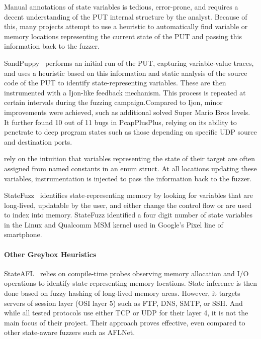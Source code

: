 \documentclass{article}
\let\savedCite=\cite
\renewcommand{\cite}{\unskip~\savedCite}
\begin{document}
\begin{multicols}{2}
  Manual annotations of state variables is tedious, error-prone, and requires a decent understanding of the PUT internal structure by the analyst. Because of this, many projects attempt to use a heuristic to automatically find variable or memory locations representing the current state of the PUT and passing this information back to the fuzzer.

  SandPuppy\cite{SandPuppy} performs an initial run of the PUT, capturing variable-value traces, and uses a heuristic based on this information and static analysis of the source code of the PUT to identify state-representing variables. These are then instrumented with a Ijon-like feedback mechanism. This process is repeated at certain intervals during the fuzzing campaign.Compared to Ijon, minor improvements were achieved, such as additional solved Super Mario Bros levels. It further found 10 out of 11 bugs in PcapPlusPlus, relying on its ability to penetrate to deep program states such as those depending on specific UDP source and destination ports.

  \citeauthor{SGFuzz} rely on the intuition that variables representing the state of their target are often assigned from named constants in an enum struct. At all locations updating these variables, instrumentation is injected to pass the information back to the fuzzer.\cite{SGFuzz}

  StateFuzz\cite{StateFuzz} identifies state-representing memory by looking for variables that are long-lived, updatable by the user, and either change the control flow or are used to index into memory. StateFuzz identified a four digit number of state variables in the Linux and Qualcomm MSM kernel used in Google's Pixel line of smartphone.

  \paragraph{Other Greybox Heuristics}

  StateAFL\cite{StateAFL} relies on compile-time probes observing memory allocation and I/O operations to identify state-representing memory locations. State inference is then done based on fuzzy hashing of long-lived memory areas. However, it targets servers of session layer (OSI layer 5) such as FTP, DNS, SMTP, or SSH. And while all tested protocols use either TCP or UDP for their layer 4, it is not the main focus of their project. Their approach proves effective, even compared to other state-aware fuzzers such as AFLNet.


\end{multicols}
\end{document}
